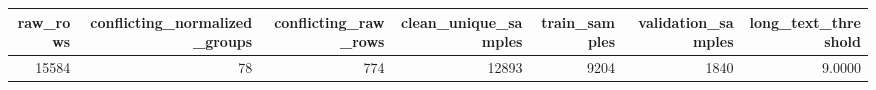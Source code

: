 \begin{tabular}{rrrrrrr}
\toprule
raw\_rows & conflicting\_normalized\_groups & conflicting\_raw\_rows & clean\_unique\_samples & train\_samples & validation\_samples & long\_text\_threshold \\
\midrule
15584 & 78 & 774 & 12893 & 9204 & 1840 & 9.0000 \\
\bottomrule
\end{tabular}
